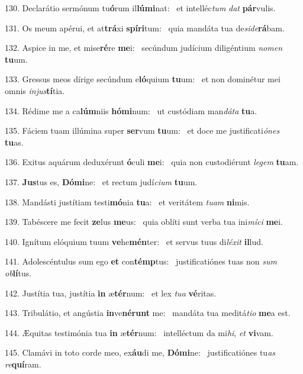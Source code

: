 130. Declarátio sermónum tu\textbf{ó}rum il\textbf{lú}\textbf{mi}nat: \ast\  et intelléc\textit{tum} \textit{dat} \textbf{pár}vulis.\

131. Os meum apérui, et at\textbf{trá}xi \textbf{spí}\textbf{ri}tum: \ast\  quia mandáta tua de\textit{si}\textit{de}\textbf{rá}bam.\

132. Aspice in me, et mise\textbf{ré}re \textbf{me}i: \ast\  secúndum judícium diligéntium \textit{no}\textit{men} \textbf{tu}um.\

133. Gressus meos dírige secúndum e\textbf{ló}quium \textbf{tu}um: \ast\  et non dominétur mei omnis \textit{in}\textit{jus}\textbf{tí}tia.\

134. Rédime me a ca\textbf{lúm}niis \textbf{hó}\textbf{mi}num: \ast\  ut custódiam man\textit{dá}\textit{ta} \textbf{tu}a.\

135. Fáciem tuam illúmina super \textbf{ser}vum \textbf{tu}um: \ast\  et doce me justificati\textit{ó}\textit{nes} \textbf{tu}as.\

136. Exitus aquárum deduxérunt \textbf{ó}culi \textbf{me}i: \ast\  quia non custodiérunt \textit{le}\textit{gem} \textbf{tu}am.\

137. \textbf{Jus}tus es, \textbf{Dó}\textbf{mi}ne: \ast\  et rectum judí\textit{ci}\textit{um} \textbf{tu}um.\

138. Mandásti justítiam testi\textbf{mó}nia \textbf{tu}a: \ast\  et veritátem \textit{tu}\textit{am} \textbf{ni}mis.\

139. Tabéscere me fecit \textbf{ze}lus \textbf{me}us: \ast\  quia oblíti sunt verba tua ini\textit{mí}\textit{ci} \textbf{me}i.\

140. Ignítum elóquium tuum \textbf{ve}he\textbf{mén}ter: \ast\  et servus tuus di\textit{lé}\textit{xit} \textbf{il}lud.\

141. Adolescéntulus sum ego \textbf{et} con\textbf{témp}tus: \ast\  justificatiónes tuas non \textit{sum} \textit{ob}\textbf{lí}tus.\

142. Justítia tua, justítia \textbf{in} æ\textbf{tér}num: \ast\  et lex \textit{tu}\textit{a} \textbf{vé}ritas.\

143. Tribulátio, et angústia \textbf{in}ve\textbf{né}\textbf{runt} me: \ast\  mandáta tua meditá\textit{ti}\textit{o} \textbf{me}a est.\

144. Æquitas testimónia tua \textbf{in} æ\textbf{tér}num: \ast\  intelléctum da mi\textit{hi}, \textit{et} \textbf{vi}vam.\

145. Clamávi in toto corde meo, ex\textbf{áu}di me, \textbf{Dó}\textbf{mi}ne: \ast\  justificatiónes tu\textit{as} \textit{re}\textbf{quí}ram.\


